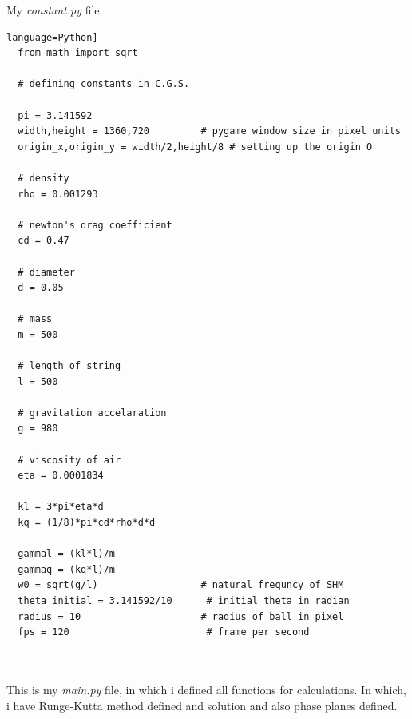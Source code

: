 \documentclass{article}
\begin{document}
My \emph{constant.py} file

\begin{lstlisting}language=Python]
  from math import sqrt

  # defining constants in C.G.S.

  pi = 3.141592
  width,height = 1360,720         # pygame window size in pixel units
  origin_x,origin_y = width/2,height/8 # setting up the origin O

  # density
  rho = 0.001293

  # newton's drag coefficient
  cd = 0.47

  # diameter
  d = 0.05

  # mass 
  m = 500

  # length of string
  l = 500

  # gravitation accelaration
  g = 980

  # viscosity of air
  eta = 0.0001834

  kl = 3*pi*eta*d
  kq = (1/8)*pi*cd*rho*d*d

  gammal = (kl*l)/m
  gammaq = (kq*l)/m
  w0 = sqrt(g/l)                  # natural frequncy of SHM
  theta_initial = 3.141592/10      # initial theta in radian
  radius = 10                     # radius of ball in pixel
  fps = 120                        # frame per second



\end{lstlisting}

This is my \emph{main.py} file, in which i defined all functions for calculations. In which, i have Runge-Kutta method defined and solution and also phase planes defined.
\end{document}
